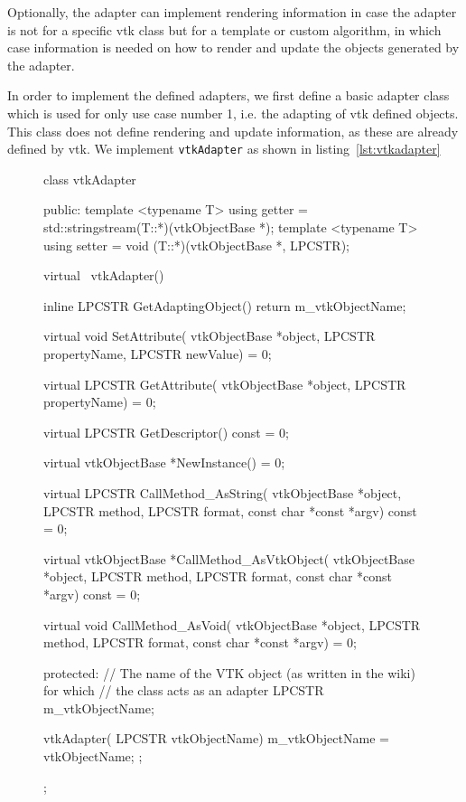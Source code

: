 Optionally, the adapter can implement rendering information in case the adapter is not for a specific \acrshort{vtk} class but for a template or custom algorithm, in which case information is needed on how to render and update the objects generated by the adapter.

In order to implement the defined adapters, we first define a basic adapter class which is used for only use case number 1, i.e. the adapting of \acrshort{vtk} defined objects. This class does not define rendering and update information, as these are already defined by \acrshort{vtk}. We implement \verb|vtkAdapter| as shown in listing~\ref{lst:vtkadapter}

\begin{figure}[ht!]
    \centering
    \begin{cpp}[label=lst:vtkadapter,caption={vtkAdapter class}]
class vtkAdapter
{
public:
    template <typename T> using getter = std::stringstream(T::*)(vtkObjectBase *);
    template <typename T> using setter = void (T::*)(vtkObjectBase *, LPCSTR);

    virtual ~vtkAdapter() { }

    inline LPCSTR GetAdaptingObject() 
    {
        return m_vtkObjectName;
    }

    virtual void SetAttribute(
        vtkObjectBase *object,
        LPCSTR propertyName,
        LPCSTR newValue) = 0;

    virtual LPCSTR GetAttribute(
        vtkObjectBase *object,
        LPCSTR propertyName) = 0;

    virtual LPCSTR GetDescriptor() const = 0;

    virtual vtkObjectBase *NewInstance() = 0;

    virtual LPCSTR CallMethod_AsString(
        vtkObjectBase *object,
        LPCSTR method,
        LPCSTR format,
        const char *const *argv) const = 0;

    virtual vtkObjectBase *CallMethod_AsVtkObject(
        vtkObjectBase *object,
        LPCSTR method,
        LPCSTR format,
        const char *const *argv) const = 0;

    virtual void CallMethod_AsVoid(
        vtkObjectBase *object,
        LPCSTR method,
        LPCSTR format,
        const char *const *argv) = 0;

protected:
    // The name of the VTK object (as written in the wiki) for which
    // the class acts as an adapter
    LPCSTR m_vtkObjectName;

    vtkAdapter(
        LPCSTR vtkObjectName) 
    { 
        m_vtkObjectName = vtkObjectName;
    };
};
    \end{cpp}
\end{figure}

